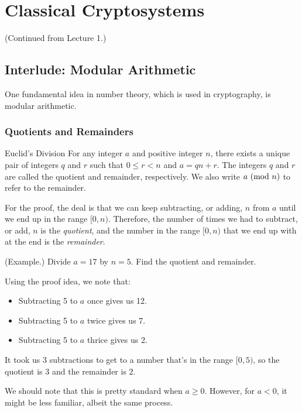 \documentclass[letterpaper]{article}
\begin{document}
\section{Classical Cryptosystems}
(Continued from Lecture 1.)
\subsection{Interlude: Modular Arithmetic}
One fundamental idea in number theory, which is used in cryptography, is modular arithmetic. 

\subsubsection{Quotients and Remainders}

\begin{lemma}{Euclid's Division}{}
    For any integer $a$ and positive integer $n$, there exists a unique pair of integers $q$ and $r$ such that $0 \leq r < n$ and $a = qn + r$. The integers $q$ and $r$ are called the quotient and remainder, respectively. We also write $a \ (\mathrm{mod}\ n)$ to refer to the remainder.
\end{lemma}
For the proof, the deal is that we can keep subtracting, or adding, $n$ from $a$ until we end up in the range $[0, n)$. Therefore, the number of times we had to subtract, or add, $n$ is the \emph{quotient}, and the number in the range $[0, n)$ that we end up with at the end is the \emph{remainder}. 

\begin{mdframed}
    (Example.) Divide $a = 17$ by $n = 5$. Find the quotient and remainder.
    
    \bigskip 

    Using the proof idea, we note that: 
    \begin{itemize}
        \item Subtracting 5 to $a$ once gives us 12. 
        \item Subtracting 5 to $a$ twice gives us 7.
        \item Subtracting 5 to $a$ thrice gives us 2.
    \end{itemize}
    It took us 3 subtractions to get to a number that's in the range $[0, 5)$, so the quotient is $\boxed{3}$ and the remainder is $\boxed{2}$. 
\end{mdframed}
We should note that this is pretty standard when $a \geq 0$. However, for $a < 0$, it might be less familiar, albeit the same process.
\end{document}
